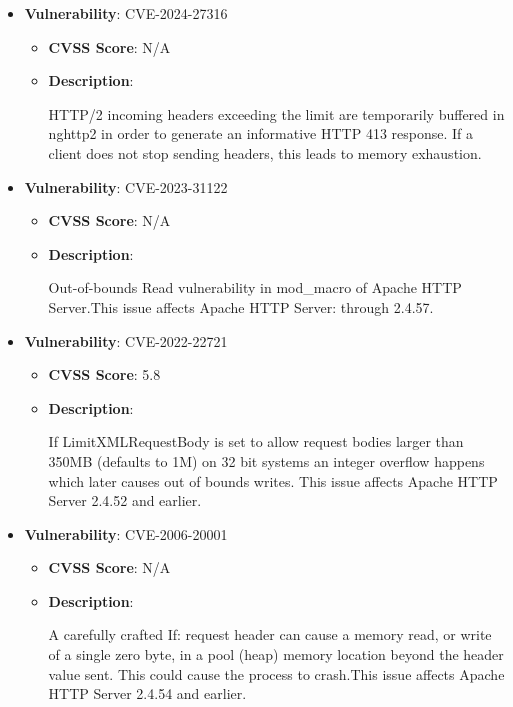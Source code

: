 \documentclass{article}
\begin{document}
\begin{itemize}
        \item \textbf{Vulnerability}: CVE-2024-27316
        \begin{itemize}
            \item \textbf{CVSS Score}:  N/A 
            \item \textbf{Description}:
            \parbox[t]{0.9\linewidth}{
                \ttfamily HTTP/2 incoming headers exceeding the limit are temporarily buffered in nghttp2 in order to generate an informative HTTP 413 response. If a client does not stop sending headers, this leads to memory exhaustion.
            }
        \end{itemize}
    
        \item \textbf{Vulnerability}: CVE-2023-31122
        \begin{itemize}
            \item \textbf{CVSS Score}:  N/A 
            \item \textbf{Description}:
            \parbox[t]{0.9\linewidth}{
                \ttfamily Out-of-bounds Read vulnerability in mod\_macro of Apache HTTP Server.This issue affects Apache HTTP Server: through 2.4.57.
            }
        \end{itemize}
    
        \item \textbf{Vulnerability}: CVE-2022-22721
        \begin{itemize}
            \item \textbf{CVSS Score}:  5.8 
            \item \textbf{Description}:
            \parbox[t]{0.9\linewidth}{
                \ttfamily If LimitXMLRequestBody is set to allow request bodies larger than 350MB (defaults to 1M) on 32 bit systems an integer overflow happens which later causes out of bounds writes. This issue affects Apache HTTP Server 2.4.52 and earlier.
            }
        \end{itemize}
    
        \item \textbf{Vulnerability}: CVE-2006-20001
        \begin{itemize}
            \item \textbf{CVSS Score}:  N/A 
            \item \textbf{Description}:
            \parbox[t]{0.9\linewidth}{
                \ttfamily A carefully crafted If: request header can cause a memory read, or write of a single zero byte, in a pool (heap) memory location beyond the header value sent. This could cause the process to crash.This issue affects Apache HTTP Server 2.4.54 and earlier.
            }
        \end{itemize}
    

\end{itemize}
\end{document}
